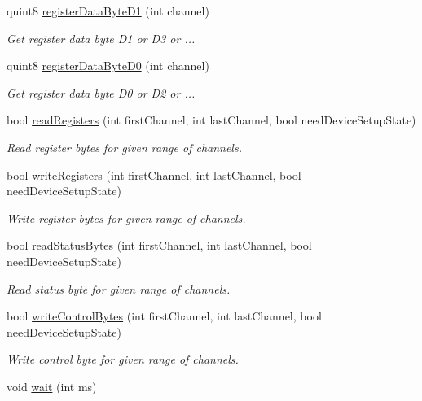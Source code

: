 \begin{DoxyCompactItemize}
quint8 \hyperlink{classmdt_device_modbus_wago_module_ae22ec3a2a0adf8407ff3c1eaeed602e6}{register\-Data\-Byte\-D1} (int channel)
\begin{DoxyCompactList}\small\item\em Get register data byte D1 or D3 or ... \end{DoxyCompactList}\item 
quint8 \hyperlink{classmdt_device_modbus_wago_module_add5a97b94ef36520b90501f6325f40cb}{register\-Data\-Byte\-D0} (int channel)
\begin{DoxyCompactList}\small\item\em Get register data byte D0 or D2 or ... \end{DoxyCompactList}\item 
bool \hyperlink{classmdt_device_modbus_wago_module_aa775cffab72f7ed7cd92a48d26da3225}{read\-Registers} (int first\-Channel, int last\-Channel, bool need\-Device\-Setup\-State)
\begin{DoxyCompactList}\small\item\em Read register bytes for given range of channels. \end{DoxyCompactList}\item 
bool \hyperlink{classmdt_device_modbus_wago_module_a8fe809c91ccbf05f77c189fbaba12b91}{write\-Registers} (int first\-Channel, int last\-Channel, bool need\-Device\-Setup\-State)
\begin{DoxyCompactList}\small\item\em Write register bytes for given range of channels. \end{DoxyCompactList}\item 
bool \hyperlink{classmdt_device_modbus_wago_module_a90bd4625c8b1efcd34cd56b31dc2f72c}{read\-Status\-Bytes} (int first\-Channel, int last\-Channel, bool need\-Device\-Setup\-State)
\begin{DoxyCompactList}\small\item\em Read status byte for given range of channels. \end{DoxyCompactList}\item 
bool \hyperlink{classmdt_device_modbus_wago_module_a92cf3b411849e57c1d392ffa1b2e2ce6}{write\-Control\-Bytes} (int first\-Channel, int last\-Channel, bool need\-Device\-Setup\-State)
\begin{DoxyCompactList}\small\item\em Write control byte for given range of channels. \end{DoxyCompactList}\item 
void \hyperlink{classmdt_device_modbus_wago_module_ab74adb7084ef031d51c91d4ce80e08db}{wait} (int ms)

\end{DoxyCompactItemize}
